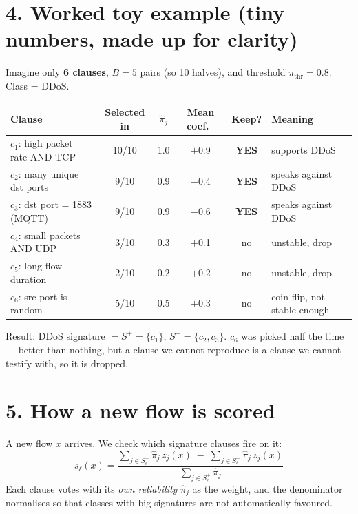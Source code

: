 \documentclass[11pt]{article}
\begin{document}
\section*{4. Worked toy example (tiny numbers, made up for clarity)}

Imagine only \textbf{6 clauses}, $B=5$ pairs (so 10 halves),
and threshold $\pi_{\mathrm{thr}} = 0.8$. Class = DDoS.

\vspace{4pt}
\begin{center}
\begin{tabular}{@{}lccccl@{}}
\toprule
Clause & Selected in & $\hat\pi_j$ & Mean coef.\ & Keep? & Meaning \\
\midrule
$c_1$: high packet rate AND TCP & 10/10 & 1.0 & $+$0.9 &
  \textcolor{goodgreen}{\textbf{YES}} & supports DDoS \\
$c_2$: many unique dst ports    & 9/10  & 0.9 & $-$0.4 &
  \textcolor{goodgreen}{\textbf{YES}} & speaks against DDoS \\
$c_3$: dst port = 1883 (MQTT)   & 9/10  & 0.9 & $-$0.6 &
  \textcolor{goodgreen}{\textbf{YES}} & speaks against DDoS \\
$c_4$: small packets AND UDP    & 3/10  & 0.3 & $+$0.1 &
  \textcolor{badred}{no} & unstable, drop \\
$c_5$: long flow duration       & 2/10  & 0.2 & $+$0.2 &
  \textcolor{badred}{no} & unstable, drop \\
$c_6$: src port is random       & 5/10  & 0.5 & $+$0.3 &
  \textcolor{badred}{no} & coin-flip, not stable enough \\
\bottomrule
\end{tabular}
\end{center}

\vspace{2pt}
Result: DDoS signature $= S^+ = \{c_1\}$, $S^- = \{c_2, c_3\}$.
$c_6$ was picked half the time --- better than nothing, but a clause we
cannot reproduce is a clause we cannot testify with, so it is dropped.

\section*{5. How a new flow is scored}

A new flow $x$ arrives. We check which signature clauses fire on it:
\[
s_{\ell}(x)=
\frac{\displaystyle\sum_{j\in S_\ell^+}\hat\pi_j\,z_j(x)
      \;-\;\sum_{j\in S_\ell^-}\hat\pi_j\,z_j(x)}
     {\displaystyle\sum_{j\in S_\ell^+}\hat\pi_j}
\]
Each clause votes with its \emph{own reliability} $\hat\pi_j$ as the weight,
and the denominator normalises so that classes with big signatures are not
automatically favoured.
\end{document}
